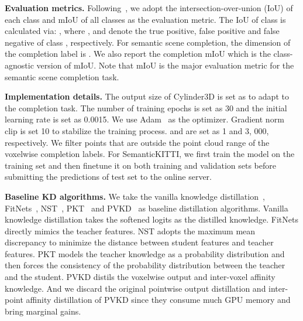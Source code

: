 \documentclass[10pt,twocolumn,letterpaper]{article}
\begin{document}
\noindent \textbf{Evaluation metrics.} Following~\cite{pvkd2022,zhu2021cylindrical}, we adopt the intersection-over-union (IoU) of each class and mIoU of all classes as the evaluation metric. The IoU of class  is calculated via: , where ,  and  denote the true positive, false positive and false negative of class , respectively. For semantic scene completion, the dimension of the completion label is . We also report the completion mIoU which is the class-agnostic version of mIoU. Note that mIoU is the major evaluation metric for the semantic scene completion task.

\noindent \textbf{Implementation details.} The output size of Cylinder3D is set as  to adapt to the completion task. The number of training epochs is set as 30 and the initial learning rate is set as 0.0015. We use Adam~\cite{kingma2015adam} as the optimizer. Gradient norm clip is set 10 to stabilize the training process.  and  are set as 1 and 3, 000, respectively. We filter points that are outside the point cloud range of the voxelwise completion labels. For SemanticKITTI, we first train the model on the training set and then finetune it on both training and validation sets before submitting the predictions of test set to the online server. 



\noindent \textbf{Baseline KD algorithms.} We take the vanilla knowledge distillation~\cite{hinton2015distilling}, FitNets~\cite{romero2015fitnets}, NST~\cite{nst}, PKT~\cite{pkt} and PVKD~\cite{pvkd2022} as baseline distillation algorithms. Vanilla knowledge distillation takes the softened logits as the distilled knowledge. FitNets directly mimics the teacher features. NST adopts the maximum mean discrepancy to minimize the distance between student features and teacher features. PKT models the teacher knowledge as a probability distribution and then forces the consistency of the probability distribution between the teacher and the student. PVKD distils the voxelwise output and inter-voxel affinity knowledge. And we discard the original pointwise output distillation and inter-point affinity distillation of PVKD since they consume much GPU memory and bring marginal gains.
\end{document}

